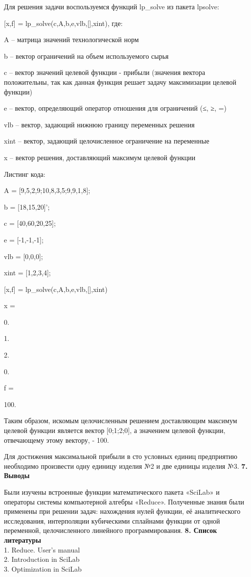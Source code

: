 \documentclass[russian,utf8,nocolumnxxxi,nocolumnxxxii]{eskdtext}
\begin{document}
Для решения задачи воспользуемся функций lp_solve из пакета lpsolve:

[x,f] = lp\_solve(c,A,b,e,vlb,[],xint), где:

A – матрица значений технологической норм

b – вектор ограничений на объем используемого сырья

c – вектор значений целевой функции - прибыли (значения вектора положительны, так как данная функция решает задачу максимизации целевой функции)

e – вектор, определяющий оператор отношения для ограничений (≤, ≥, =)

vlb – вектор, задающий нижнюю границу переменных решения

xint – вектор, задающий целочисленное ограничение на переменные

x – вектор решения, доставляющий максимум целевой функции

Листинг кода:

A = [9,5,2,9;10,8,3,5;9,9,1,8];

b = [18,15,20]’;

c = [40,60,20,25];

e = [-1,-1,-1];

vlb = [0,0,0];

xint = [1,2,3,4];

[x,f] = lp\_solve(c,A,b,e,vlb,[],xint)

x =

0.

1.

2.

0.

f =

100.

Таким образом, искомым целочисленным решением доставляющим максимум целевой функции является вектор [0;1;2;0], а значением целевой функции, отвечающему этому вектору, - 100.

Для достижения максимальной прибыли в сто условных единиц предприятию необходимо произвести одну единицу изделия №2 и две единицы изделия №3.
\newpage
{\bf 7. Выводы}

Были изучены встроенные функции математического пакета «SciLab» и операторы системы компьютерной алгебры «Reduce». Полученные знания были применены при решении задач: нахождения нулей функции, её аналитического исследования, интерполяции кубическими сплайнами функции от одной переменной, целочисленного линейного программирования.
\newpage
{\bf8. Список литературы}
\\1. Reduce. User’s manual
\\2. Introduction in SciLab
\\3. Optimization in SciLab
\end{document}
